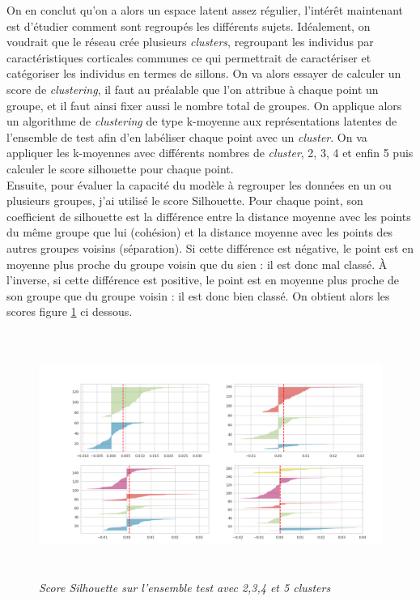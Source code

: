 \documentclass[12pt, oneside, a4paper, titlepage]{article}
\begin{document}
On en conclut qu'on a alors un espace latent assez régulier, l'intérêt maintenant est d'étudier comment sont regroupés les différents sujets. Idéalement, on voudrait que le réseau crée plusieurs \textit{clusters}, regroupant les individus par caractéristiques corticales communes ce qui permettrait de caractériser et catégoriser les individus en termes de sillons. On va alors essayer de calculer un score de \textit{clustering}, il faut au préalable que l'on attribue à chaque point un groupe, et il faut ainsi fixer aussi le nombre total de groupes. On applique alors un algorithme de \textit{clustering} de type k-moyenne aux représentations latentes de l'ensemble de test afin d'en labéliser chaque point avec un \textit{cluster}. On va appliquer les k-moyennes avec différents nombres de \textit{cluster}, 2, 3, 4 et enfin 5 puis calculer le score silhouette pour chaque point.\\ 

Ensuite, pour évaluer la capacité du modèle à regrouper les données en un ou plusieurs groupes, j'ai utilisé le score Silhouette. Pour chaque point, son coefficient de silhouette est la différence entre la distance moyenne avec les points du même groupe que lui (cohésion) et la distance moyenne avec les points des autres groupes voisins (séparation). Si cette différence est négative, le point est en moyenne plus proche du groupe voisin que du sien : il est donc mal classé. À l'inverse, si cette différence est positive, le point est en moyenne plus proche de son groupe que du groupe voisin : il est donc bien classé.
On obtient alors les scores figure \ref{fig:expl2} ci dessous.

\begin{figure}[H]
    \centering
\includegraphics[width=12cm, height=8cm]{silhouettescore.png}
    \caption{\textit{Score Silhouette sur l'ensemble test avec 2,3,4 et 5 clusters}}
    \label{fig:expl2}
\end{figure}
\end{document}
